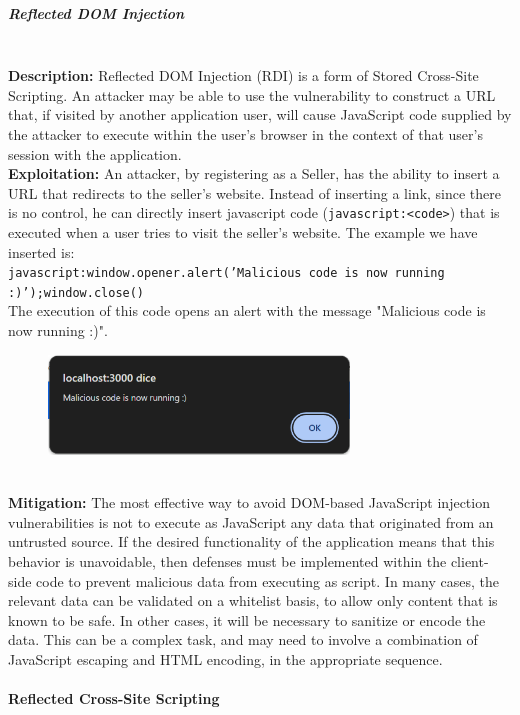 \documentclass[]{article}
\begin{document}
\subparagraph{Reflected DOM Injection} \mbox{} \\ 
\textbf{Description:} Reflected DOM Injection (RDI) is a form of Stored Cross-Site Scripting. An attacker may be able to use the vulnerability to construct a URL that, if visited by another application user, will cause JavaScript code supplied by the attacker to execute within the user's browser in the context of that user's session with the application.
\\ \textbf{Exploitation:} An attacker, by registering as a Seller, has the ability to insert a URL that redirects to the seller's website. Instead of inserting a link, since there is no control, he can directly insert javascript code (\texttt{javascript:<code>}) that is executed when a user tries to visit the seller's website. The example we have inserted is: \\ 
\texttt{javascript:window.opener.alert('Malicious code is now running :)');window.close()} \\
The execution of this code opens an alert with the message "Malicious code is now running :)".
\begin{figure}[h]
\includegraphics[width=8cm]{images/ReflectedDOMInj.eps}
\centering
\end{figure}
\\ \textbf{Mitigation:}
The most effective way to avoid DOM-based JavaScript injection vulnerabilities is not to execute as JavaScript any data that originated from an untrusted source. If the desired functionality of the application means that this behavior is unavoidable, then defenses must be implemented within the client-side code to prevent malicious data from executing as script. In many cases, the relevant data can be validated on a whitelist basis, to allow only content that is known to be safe. In other cases, it will be necessary to sanitize or encode the data. This can be a complex task, and may need to involve a combination of JavaScript escaping and HTML encoding, in the appropriate sequence.

\paragraph{Reflected Cross-Site Scripting}
\end{document}
